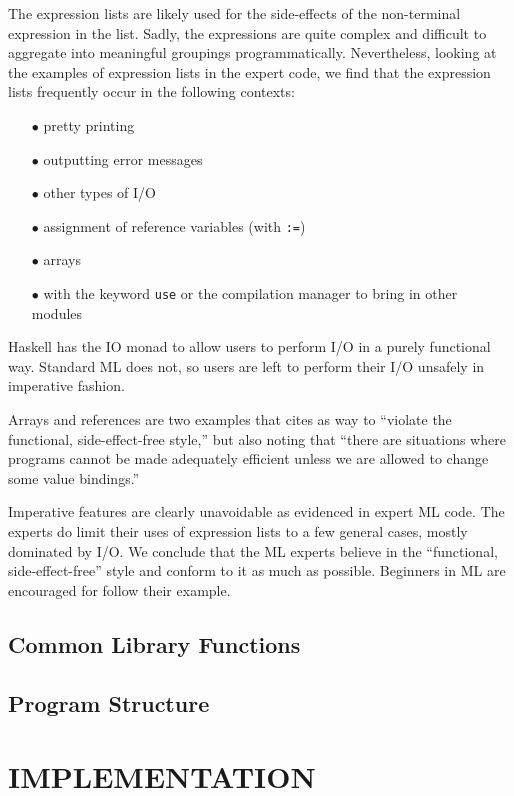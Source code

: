 \documentclass[12pt,abstracton]{scrartcl}
\begin{document}
The expression lists are likely used for the side-effects of the non-terminal
expression in the list. Sadly, the expressions are quite complex and difficult
to aggregate into meaningful groupings programmatically. Nevertheless,
looking at the examples of expression lists in the expert code, we find that
the expression lists frequently occur in the following contexts:
\begin{itemize}
\item[$\bullet$] pretty printing
\item[$\bullet$] outputting error messages
\item[$\bullet$] other types of I/O
\item[$\bullet$] assignment of reference variables (with \texttt{:=})
\item[$\bullet$] arrays
\item[$\bullet$] with the keyword \texttt{use} or the compilation manager to bring in other modules
\end{itemize}

Haskell has the IO monad to allow users to perform I/O in a purely functional way. \cite{Jon93}
Standard ML does not, so users are left to perform their
I/O unsafely in imperative fashion.

Arrays and references are two examples that \cite{Ull98} cites as way to ``violate the functional,
side-effect-free style,'' but also noting that ``there are situations where programs cannot
be made adequately efficient unless we are allowed to change some value bindings.''

Imperative features are clearly unavoidable as evidenced in expert ML code. The experts do
limit their uses of expression lists to a few general cases, mostly dominated by I/O.
We conclude that the ML experts believe in the ``functional, side-effect-free'' style
and conform to it as much as possible. Beginners in ML are encouraged for follow their example.
\subsection{Common Library Functions}\label{subsec:imp}
\subsection{Program Structure}\label{subsec:struct}
\section{IMPLEMENTATION}\label{sec:impl}
\end{document}
